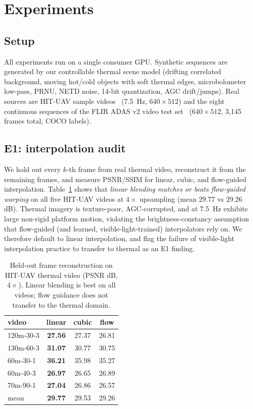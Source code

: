 \section{Experiments}
\label{sec:experiments}

\subsection{Setup}
All experiments run on a single consumer GPU. Synthetic sequences are
generated by our controllable thermal scene model (drifting correlated
background, moving hot/cold objects with soft thermal edges, microbolometer
low-pass, PRNU, NETD noise, 14-bit quantization, AGC drift/jumps). Real
sources are HIT-UAV sample videos~\cite{suo2023hituav} (\SI{7.5}{\hertz},
$640{\times}512$) and the eight continuous sequences of the FLIR ADAS v2
video test set~\cite{fliradas} ($640{\times}512$, 3{,}145 frames total,
COCO labels).

\subsection{E1: interpolation audit}
\label{sec:e1}
We hold out every $k$-th frame from real thermal video, reconstruct it from
the remaining frames, and measure PSNR/SSIM for linear, cubic, and
flow-guided interpolation. Table~\ref{tab:e1} shows that
\emph{linear blending matches or beats flow-guided warping} on all five
HIT-UAV videos at $4\times$ upsampling (mean 29.77 vs 29.26 dB). Thermal
imagery is texture-poor, AGC-corrupted, and at \SI{7.5}{\hertz} exhibits large
non-rigid platform motion, violating the brightness-constancy assumption
that flow-guided (and learned, visible-light-trained) interpolators rely
on. We therefore default to linear interpolation, and flag the failure of
visible-light interpolation practice to transfer to thermal as an E1
finding.

\begin{table}[t]
\centering
\caption{Held-out frame reconstruction on HIT-UAV thermal video (PSNR dB, $4\times$). Linear blending is best on all videos; flow guidance does not transfer to the thermal domain.}
\label{tab:e1}
\begin{tabular}{lccc}
\toprule
video & linear & cubic & flow \\
\midrule
120m-30-3 & \textbf{27.56} & 27.37 & 26.81 \\
130m-60-3 & \textbf{31.07} & 30.77 & 30.75 \\
60m-30-1 & \textbf{36.21} & 35.98 & 35.27 \\
60m-40-3 & \textbf{26.97} & 26.65 & 26.89 \\
70m-90-1 & \textbf{27.04} & 26.86 & 26.57 \\
\midrule
mean & \textbf{29.77} & 29.53 & 29.26 \\
\bottomrule
\end{tabular}
\end{table}

